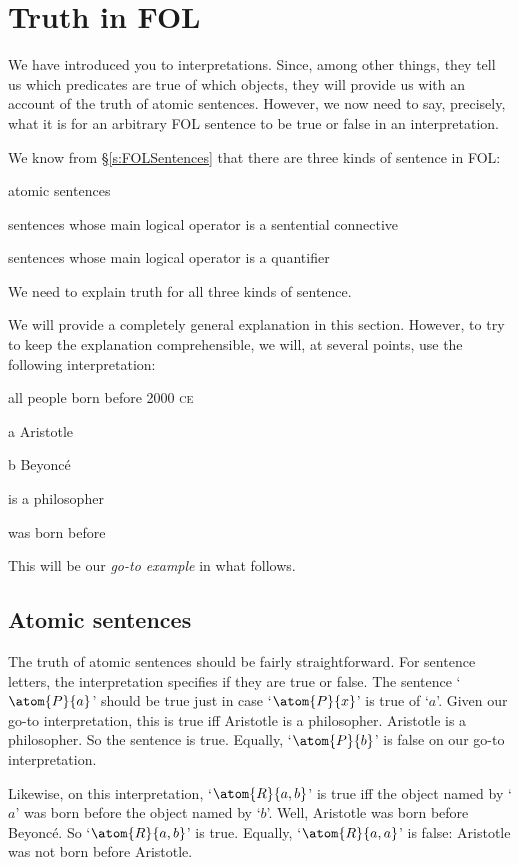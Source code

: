 \chapter{Truth in FOL}\label{s:TruthFOL}
We have introduced you to interpretations. Since, among other things, they tell us which predicates are true of which objects, they will provide us with an account of the truth of atomic sentences. However, we now need to say, precisely, what it is for an arbitrary FOL sentence to be true or false in an interpretation.

We know from \S\ref{s:FOLSentences} that there are three kinds of sentence in FOL: 
	\begin{ebullet}
		\item atomic sentences
		\item sentences whose main logical operator is a sentential connective
		\item sentences whose main logical operator is a quantifier
	\end{ebullet}
We need to explain truth for all three kinds of sentence.

We will provide a completely general explanation in this section. However, to try to keep the explanation comprehensible, we will, at several points, use the following interpretation:
	\begin{ekey}
		\item[\text{domain}] all people born before 2000 \textsc{ce}
		\item[a] Aristotle
		\item[b] Beyonc\'e
		\item[\atom{P}{x}]  is a philosopher
		\item[\atom{R}{x,y}]  was born before 
	\end{ekey}
This will be our \emph{go-to example} in what follows.

\section{Atomic sentences}
The truth of atomic sentences should be fairly straightforward. For sentence letters, the interpretation specifies if they are true or false. The sentence `$\atom{P}{a}$' should be true just in case `$\atom{P}{x}$' is true of `$a$'. Given our go-to interpretation, this is true iff Aristotle is a philosopher. Aristotle is a philosopher. So the sentence is true. Equally, `$\atom{P}{b}$' is false on our go-to interpretation.

Likewise, on this interpretation, `$\atom{R}{a,b}$' is true iff the object named by `$a$' was born before the object named by `$b$'. Well, Aristotle was born before Beyonc\'e. So `$\atom{R}{a,b}$' is true. Equally, `$\atom{R}{a,a}$' is false: Aristotle was not born before Aristotle.


